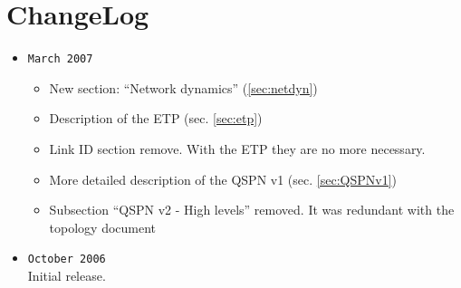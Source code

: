\documentclass[a4paper]{article}
\begin{document}
\section{ChangeLog}
\begin{itemize}
	\item \verb|March 2007|
		\begin{itemize}
			\item New section: ``Network dynamics'' (\ref{sec:netdyn})
			\item Description of the ETP (sec.  \ref{sec:etp})
			\item Link ID section remove. With the ETP they are no
				more necessary.
			\item More detailed description of the QSPN v1 (sec. \ref{sec:QSPNv1})
			\item Subsection ``QSPN v2 - High levels'' removed. It
				was redundant with the topology
				document\cite{ntktopology}
		\end{itemize}
	\item \verb|October 2006|\\
		Initial release.
\end{itemize}

\end{document}
